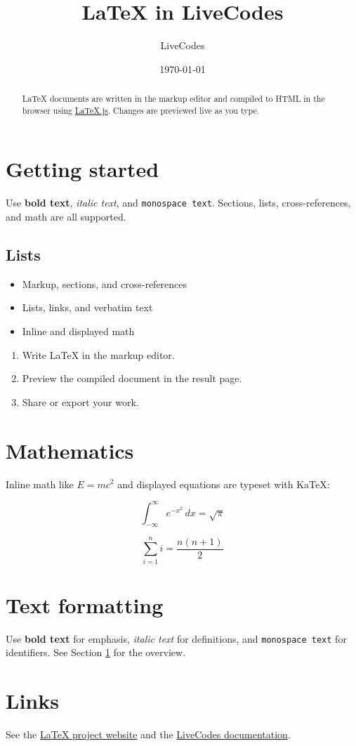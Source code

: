 \documentclass{article}
\title{LaTeX in LiveCodes}
\author{LiveCodes}
\date{\today}
\begin{document}
\maketitle

\begin{abstract}
LaTeX documents are written in the markup editor and compiled to HTML in the browser using
\href{https://github.com/michael-brade/LaTeX.js}{LaTeX.js}. Changes are previewed live as you type.
\end{abstract}

\section{Getting started}
\label{sec:start}

Use \textbf{bold text}, \emph{italic text}, and \texttt{monospace text}. Sections, lists,
cross-references, and math are all supported.

\subsection{Lists}

\begin{itemize}
  \item Markup, sections, and cross-references
  \item Lists, links, and verbatim text
  \item Inline and displayed math
\end{itemize}

\begin{enumerate}
  \item Write LaTeX in the markup editor.
  \item Preview the compiled document in the result page.
  \item Share or export your work.
\end{enumerate}

\section{Mathematics}

Inline math like $E = mc^2$ and displayed equations are typeset with KaTeX:

\[
  \int_{-\infty}^{\infty} e^{-x^2} \, dx = \sqrt{\pi}
\]

\[
  \sum_{i=1}^{n} i = \frac{n(n+1)}{2}
\]

\section{Text formatting}

Use \textbf{bold text} for emphasis, \emph{italic text} for definitions, and \texttt{monospace text}
for identifiers. See Section \ref{sec:start} for the overview.

\section{Links}

See the \href{https://www.latex-project.org/}{LaTeX project website} and the
\href{https://livecodes.io/docs/languages/latex}{LiveCodes documentation}.
\end{document}
